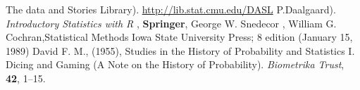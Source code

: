 \begin{thebibliography}{}
	{The data and Stories Library). {\url{http://lib.stat.cmu.edu/DASL}} }
	{P.Daalgaard). {\it  Introductory Statistics with R }, {\bf Springer}, }
	{George W. Snedecor , William G. Cochran,Statistical Methods }Iowa State University Press; 8 edition (January 15, 1989)
	{David F. M., (1955), Studies in the History of Probability and Statistics I. Dicing and Gaming (A Note on the History of Probability).} {\it Biometrika Trust}, {\bf 42}, 1--15.
\end{thebibliography}	 

 	
